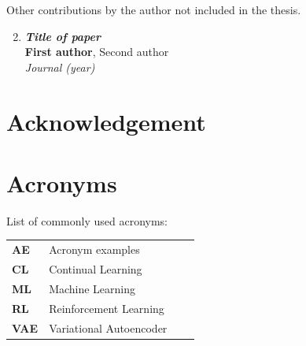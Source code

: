 \documentclass[electronic]{kthesis}
\begin{document}
	Other contributions by the author not included in the thesis.
	\begin{enumerate}[I]
		\setcounter{enumi}{1}
		\item \textbf{\textit{Title of paper}} \\
		\textbf{First author}, Second author \\
		\textit{Journal (year)}
	\end{enumerate}
	\chapter{Acknowledgement}
	\noindent \lipsum[1]
	
	\chapter{Acronyms}
	List of commonly used acronyms: \\
	
	\begin{tabular}{llll}
		\textbf{AE}		&	Acronym examples \\
		\textbf{CL}		& 	Continual Learning \\
		\textbf{ML}		& 	Machine Learning \\
		\textbf{RL}		& 	Reinforcement Learning \\
		\textbf{VAE}		&	Variational Autoencoder \\
		
	\end{tabular}
	
	
	\mainmatter %
	\tableofcontents
	
\end{document}
